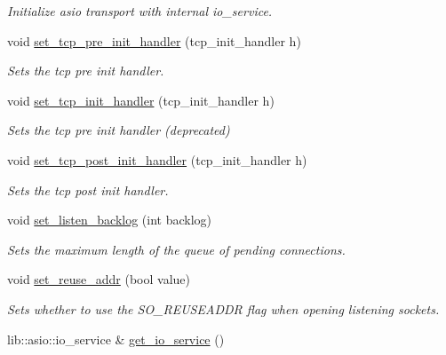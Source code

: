 \begin{DoxyCompactItemize}
\begin{DoxyCompactList}\small\item\em Initialize asio transport with internal io\+\_\+service. \end{DoxyCompactList}\item 
void \mbox{\hyperlink{classwebsocketpp_1_1transport_1_1asio_1_1endpoint_ad334b214cf4800bb34aa09d7055e6464}{set\+\_\+tcp\+\_\+pre\+\_\+init\+\_\+handler}} (tcp\+\_\+init\+\_\+handler h)
\begin{DoxyCompactList}\small\item\em Sets the tcp pre init handler. \end{DoxyCompactList}\item 
void \mbox{\hyperlink{classwebsocketpp_1_1transport_1_1asio_1_1endpoint_a497f353a5ec277355cd8b0caf893d1ce}{set\+\_\+tcp\+\_\+init\+\_\+handler}} (tcp\+\_\+init\+\_\+handler h)
\begin{DoxyCompactList}\small\item\em Sets the tcp pre init handler (deprecated) \end{DoxyCompactList}\item 
void \mbox{\hyperlink{classwebsocketpp_1_1transport_1_1asio_1_1endpoint_a605c9f8c671d783739c1e98c6c7fda9d}{set\+\_\+tcp\+\_\+post\+\_\+init\+\_\+handler}} (tcp\+\_\+init\+\_\+handler h)
\begin{DoxyCompactList}\small\item\em Sets the tcp post init handler. \end{DoxyCompactList}\item 
void \mbox{\hyperlink{classwebsocketpp_1_1transport_1_1asio_1_1endpoint_a60bb0d01c277b7cfcb6f69215a36b216}{set\+\_\+listen\+\_\+backlog}} (int backlog)
\begin{DoxyCompactList}\small\item\em Sets the maximum length of the queue of pending connections. \end{DoxyCompactList}\item 
void \mbox{\hyperlink{classwebsocketpp_1_1transport_1_1asio_1_1endpoint_a491d13d6e1ad0edc5843e41b06fa4e0c}{set\+\_\+reuse\+\_\+addr}} (bool value)
\begin{DoxyCompactList}\small\item\em Sets whether to use the S\+O\+\_\+\+R\+E\+U\+S\+E\+A\+D\+DR flag when opening listening sockets. \end{DoxyCompactList}\item 
lib\+::asio\+::io\+\_\+service \& \mbox{\hyperlink{classwebsocketpp_1_1transport_1_1asio_1_1endpoint_a97efb3c1915ae8cc38ef92ff9514ebd4}{get\+\_\+io\+\_\+service}} ()

\end{DoxyCompactItemize}
